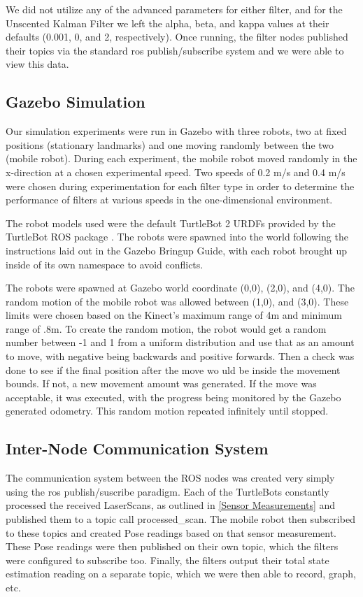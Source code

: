 \documentclass[conference]{IEEEtran} \usepackage[T1]{fontenc} \usepackage[backend=biber, style=ieee]{biblatex}
\begin{document}
We did not utilize any of the advanced parameters for either filter, and for the Unscented Kalman Filter we left the
alpha, beta, and kappa values at their defaults (0.001, 0, and 2, respectively). Once running, the filter nodes
published their topics via the standard ros publish/subscribe system and we were able to view this data.


\subsection{Gazebo Simulation} \label{Gazebo Simulation} Our simulation experiments were run in Gazebo with three
robots, two at fixed positions (stationary landmarks) and one moving randomly between the two (mobile robot). During
each experiment, the mobile robot moved randomly in the x-direction at a chosen experimental speed. Two speeds of 0.2
m/s and 0.4 m/s were chosen during experimentation for each filter type in order to determine the performance of filters
at various speeds in the one-dimensional environment.

The robot models used were the default TurtleBot 2 URDFs provided by the TurtleBot ROS package \cite{turtlebot}. The
robots were spawned into the world following the instructions laid out in the Gazebo Bringup Guide, with each robot
brought up inside of its own namespace to avoid conflicts.

The robots were spawned at Gazebo world coordinate (0,0), (2,0), and (4,0). The random motion of the mobile robot was
allowed between (1,0), and (3,0). These limits were chosen based on the Kinect's maximum range of 4m and minimum range
of .8m. To create the random motion, the robot would get a random number between -1 and 1 from a uniform distribution
and use that as an amount to move, with negative being backwards and positive forwards. Then a check was done to see if
the final position after the move wo uld be inside the movement bounds. If not, a new movement amount was generated. If
the move was acceptable, it was executed, with the progress being monitored by the Gazebo generated odometry. This
random motion repeated infinitely until stopped.

\subsection{Inter-Node Communication System} \label{Inter-Node Communication System} The communication system between
the ROS nodes was created very simply using the ros publish/suscribe paradigm. Each of the TurtleBots constantly
processed the received LaserScans, as outlined in \ref{Sensor Measurements} and published them to a topic call
processed\_scan. The mobile robot then subscribed to these topics and created Pose readings based on that sensor
measurement. These Pose readings were then published on their own topic, which the filters were configured to subscribe
too. Finally, the filters output their total state estimation reading on a separate topic, which we were then able to
record, graph, etc.
\end{document}
